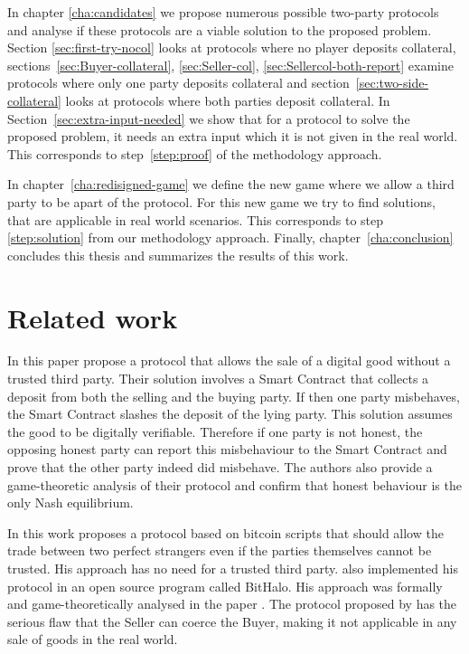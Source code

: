 \documentclass{cacthesis}
\begin{document}
	In chapter \ref{cha:candidates} we propose numerous possible two-party protocols and analyse if these protocols are a viable solution to the proposed problem. Section \ref{sec:first-try-nocol} looks at protocols where no player deposits collateral, sections~\ref{sec:Buyer-collateral}, \ref{sec:Seller-col}, \ref{sec:Sellercol-both-report} examine protocols where only one party deposits collateral and section~\ref{sec:two-side-collateral} looks at protocols where both parties deposit collateral. In Section~\ref{sec:extra-input-needed} we show that for a protocol to solve the proposed problem, it needs an extra input which it is not given in the real world. This corresponds to step~\ref{step:proof} of the methodology approach.  \newline
	
	In chapter~\ref{cha:redisigned-game} we define the new game where we allow a third party to be apart of the protocol. For this new game we try to find solutions, that are applicable in  real world scenarios. This corresponds to step \ref{step:solution} from our methodology approach. Finally, chapter~\ref{cha:conclusion} concludes this thesis and summarizes the results of this work.
\section{Related work}
In this paper \citeauthor{asgaonkar_solving_2019} propose a protocol that allows the sale of a digital good without a trusted third party. Their solution involves a Smart Contract that collects a deposit from both the selling and the buying party. If then one party misbehaves, the Smart Contract slashes the deposit of the lying party.  This solution assumes the good to be digitally verifiable. Therefore if one party is not honest, the opposing honest party can report this misbehaviour to the Smart Contract and prove that the other party indeed did misbehave. The authors also provide a game-theoretic analysis of their protocol and confirm that honest behaviour is the only Nash equilibrium.\newline

In this work \citeauthor{zimbeck_two_nodate} proposes a protocol based on bitcoin scripts that should allow the trade between two perfect strangers even if the parties themselves cannot be trusted. His approach has no need for a trusted third party. \citeauthor{zimbeck_two_nodate} also implemented his protocol in an open source program called BitHalo. His approach was formally and game-theoretically analysed in the paper \cite{bodei_validation_2015}. The protocol proposed by \citeauthor{zimbeck_two_nodate} has the serious flaw that the Seller can coerce the Buyer\cite{goharshady_irrationality_2021}, making it not applicable in any sale of goods in the real world.\newline
\end{document}
